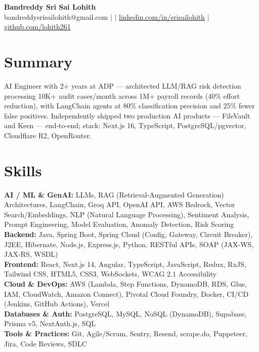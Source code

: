 \documentclass[10pt,letterpaper]{article}
\newcommand{\skillrow}[2]{\textbf{#1:} #2 \\[1pt]}
\begin{document}
\begin{center}
  {\Huge\bfseries Bandreddy Sri Sai Lohith}\\[3pt]
  \small bandreddysrisailohith@gmail.com $\vert$ $\vert$\; \href{https://linkedin.com/in/srisailohith}{linkedin.com/in/srisailohith} $\vert$\; \href{https://github.com/lohith261}{github.com/lohith261}
\end{center}

\section{Summary}

AI Engineer with 2+ years at ADP --- architected LLM/RAG risk detection processing 10K+ audit cases/month across 1M+ payroll records (40\% effort reduction), with LangChain agents at 80\% classification precision and 25\% fewer false positives.
      Independently shipped two production AI products --- FileVault and Keen --- end-to-end; stack: Next.js 16, TypeScript, PostgreSQL/pgvector, Cloudflare R2, OpenRouter.

\section{Skills}

\skillrow{AI / ML \& GenAI}{LLMs, RAG (Retrieval-Augmented Generation) Architectures, LangChain, Groq API, OpenAI API, AWS Bedrock, Vector Search/Embeddings, NLP (Natural Language Processing), Sentiment Analysis, Prompt Engineering, Model Evaluation, Anomaly Detection, Risk Scoring}
\skillrow{Backend}{Java, Spring Boot, Spring Cloud (Config, Gateway, Circuit Breaker), J2EE, Hibernate, Node.js, Express.js, Python, RESTful APIs, SOAP (JAX-WS, JAX-RS, WSDL)}
\skillrow{Frontend}{React, Next.js 14, Angular, TypeScript, JavaScript, Redux, RxJS, Tailwind CSS, HTML5, CSS3, WebSockets, WCAG 2.1 Accessibility}
\skillrow{Cloud \& DevOps}{AWS (Lambda, Step Functions, DynamoDB, RDS, Glue, IAM, CloudWatch, Amazon Connect), Pivotal Cloud Foundry, Docker, CI/CD (Jenkins, GitHub Actions), Vercel}
\skillrow{Databases \& Auth}{PostgreSQL, MySQL, NoSQL (DynamoDB), Supabase, Prisma v5, NextAuth.js, SQL}
\skillrow{Tools \& Practices}{Git, Agile/Scrum, Sentry, Resend, scrape.do, Puppeteer, Jira, Code Reviews, SDLC}
\end{document}
